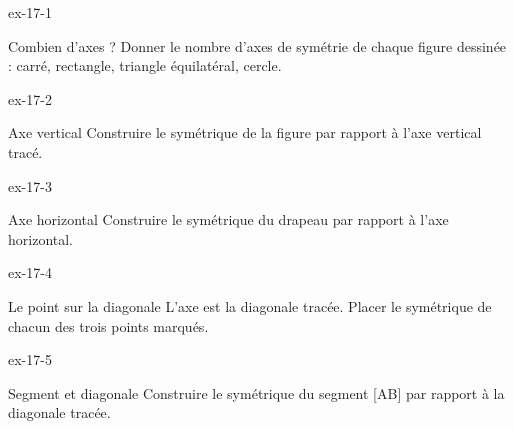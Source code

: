 \clearpage{}
\begin{blocLivre}{ex-17-1}\begin{exercice}[1]{Combien d’axes ?}
Donner le nombre d’axes de symétrie de chaque figure dessinée : carré, rectangle, triangle équilatéral, cercle.
\label{fig-ex-17-1}
\end{exercice}\end{blocLivre}
\begin{blocLivre}{ex-17-2}\begin{exercice}[1]{Axe vertical}
Construire le symétrique de la figure par rapport à l’axe vertical tracé.
\label{fig-ex-17-2}
\end{exercice}\end{blocLivre}
\begin{blocLivre}{ex-17-3}\begin{exercice}[1]{Axe horizontal}
Construire le symétrique du drapeau par rapport à l’axe horizontal.
\label{fig-ex-17-3}
\end{exercice}\end{blocLivre}
\begin{blocLivre}{ex-17-4}\begin{exercice}[1]{Le point sur la diagonale}
L’axe est la diagonale tracée. Placer le symétrique de chacun des trois points marqués.
\label{fig-ex-17-4}
\end{exercice}\end{blocLivre}
\begin{blocLivre}{ex-17-5}\begin{exercice}[1]{Segment et diagonale}
Construire le symétrique du segment [AB] par rapport à la diagonale tracée.
\label{fig-ex-17-5}
\end{exercice}\end{blocLivre}

